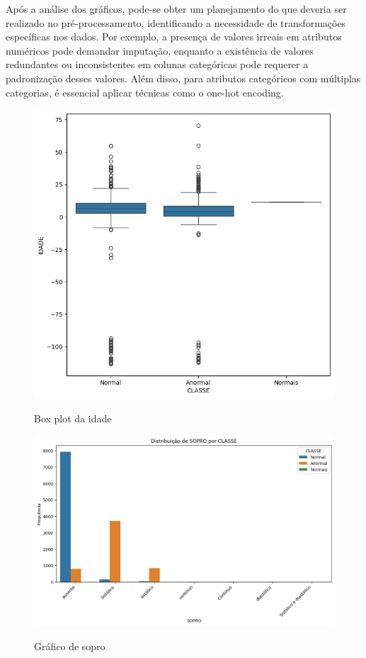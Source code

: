 \documentclass[10pt, conference, compsocconf]{IEEEtran}
\begin{document}
Após a análise dos gráficos, pode-se obter um planejamento do que deveria ser realizado no pré-processamento, 
identificando a necessidade de transformações específicas nos dados. Por exemplo, a presença de valores irreais em 
atributos numéricos pode demandar imputação, enquanto a existência de valores redundantes ou inconsistentes em colunas 
categóricas pode requerer a padronização desses valores. Além disso, para atributos categóricos com múltiplas categorias, 
é essencial aplicar técnicas como o one-hot encoding.
\begin{figure}[htbp]
  \centering
  \begin{minipage}{0.2\textwidth} 
    \centering
    \includegraphics[width=\textwidth]{box_plot_idade.png} 
    \tiny{\caption{Box plot da idade}}
    \label{fig:box_plot_idade}
  \end{minipage}
  \hfill 
  \begin{minipage}{0.2\textwidth}
    \centering
    \includegraphics[width=\textwidth]{sopro.png}
    \tiny{\caption{Gráfico de sopro}}
    \label{fig:sopro}
  \end{minipage}
  \label{fig:exemplo}
\end{figure}
\end{document}
